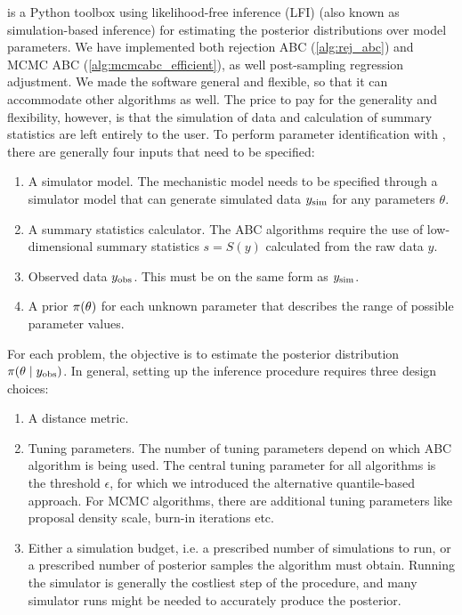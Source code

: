  is a Python toolbox using likelihood-free inference (LFI) (also known as simulation-based inference) for estimating the posterior distributions over model parameters. We have implemented both rejection ABC (\cref{alg:rej_abc}) and MCMC ABC (\cref{alg:mcmcabc_efficient}), as well post-sampling regression adjustment. We made the software general and flexible, so that it can accommodate other algorithms as well. The price to pay for the generality and flexibility, however, is that the simulation of data and calculation of summary statistics are left entirely to the user. To perform parameter identification with , there are generally four inputs that need to be specified:
\begin{enumerate}
    \item A simulator model. The mechanistic model needs to be specified through a simulator model that can generate simulated data $y_\mathrm{sim}$ for any parameters $\theta$. 
    \item A summary statistics calculator. The ABC algorithms require the use of low-dimensional summary statistics $s = S(y)$ calculated from the raw data $y$. 
    \item Observed data $y_\mathrm{obs}$. This must be on the same form as $y_\mathrm{sim}$.
    \item A prior $\pi \qty(\theta)$ for each unknown parameter that describes the range of possible parameter values. 
\end{enumerate}
For each problem, the objective is to estimate the posterior distribution $\pi \qty(\theta \mid y_\mathrm{obs})$. In general, setting up the inference procedure requires three design choices: 
\begin{enumerate}
    \item A distance metric.
    \item Tuning parameters. The number of tuning parameters depend on which ABC algorithm is being used. The central tuning parameter for all algorithms is the threshold $\epsilon$, for which we introduced the alternative quantile-based approach. For MCMC algorithms, there are additional tuning parameters like proposal density scale, burn-in iterations etc. 
    \item Either a simulation budget, i.e. a prescribed number of simulations to run, or a prescribed number of posterior samples the algorithm must obtain. Running the simulator is generally the costliest step of the procedure, and many simulator runs might be needed to accurately produce the posterior.
\end{enumerate}




